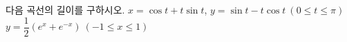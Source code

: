 다음 곡선의 길이를 구하시오.
 $x=\cos t+t\sin t$, $y=\sin t-t\cos t\ (0\le t\le\pi)$
 $y=\dfrac{1}{2}(e^x+e^{-x})\ (-1\le x\le 1)$
